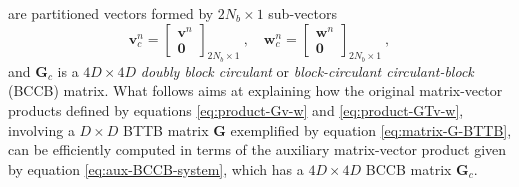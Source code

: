 \documentclass[utf8]{FrontiersinHarvard} %
\begin{document}
	are partitioned vectors formed by $2N_{b} \times 1$ sub-vectors
	\begin{equation}
		\mathbf{v}_{c}^{n} = \begin{bmatrix}
			\mathbf{v}^{n} \\ \mathbf{0}
		\end{bmatrix}_{2N_{b} \times 1} \: , \quad 
		\mathbf{w}_{c}^{n} = \begin{bmatrix}
			\mathbf{w}^{n} \\ \mathbf{0}
		\end{bmatrix}_{2N_{b} \times 1} \: ,
		\label{eq:vectors-vc-wc-ell}
	\end{equation}
	and $\mathbf{G}_{c}$ is a $4D \times 4D$ \textit{doubly block circulant} \cite[][p. 28]{jain1989} or 
	\textit{block-circulant circulant-block} (BCCB) \cite[][p. 76]{chan-jin2007} matrix.
	What follows aims at explaining how the original matrix-vector products defined by equations \ref{eq:product-Gv-w}
	and \ref{eq:product-GTv-w}, involving a $D \times D$ BTTB matrix $\mathbf{G}$ exemplified by equation \ref{eq:matrix-G-BTTB}, 
	can be efficiently computed in terms of the auxiliary matrix-vector product given by equation \ref{eq:aux-BCCB-system}, which
	has a $4D \times 4D$ BCCB matrix $\mathbf{G}_{c}$.
	
\end{document}
